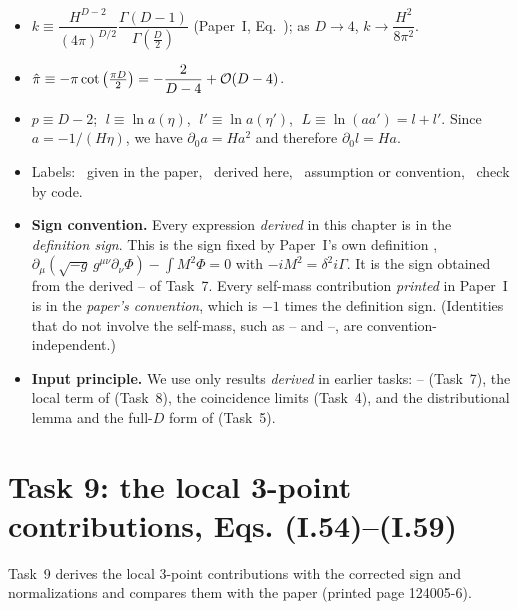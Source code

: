 \begin{notebox}
\begin{itemize}[leftmargin=1.2em,itemsep=1pt]
\item $k\equiv\dfrac{H^{D-2}}{(4\pi)^{D/2}}\dfrac{\Gamma(D-1)}{\Gamma(\frac D2)}$ (Paper~I, Eq.~); as $D\to4$, $k\to\dfrac{H^2}{8\pi^2}$.
\item $\hat\pi\equiv-\pi\cot\big(\tfrac{\pi D}{2}\big)=-\dfrac{2}{D-4}+\mathcal{O}\!\left(D-4\right)$.
\item $p\equiv D-2$; $\;l\equiv\ln a(\eta)$, $\;l'\equiv\ln a(\eta')$, $\;L\equiv\ln(aa')=l+l'$.
Since $a=-1/(H\eta)$, we have $\partial_0a=Ha^2$ and therefore $\partial_0 l=Ha$.
\item Labels: \tP\ given in the paper, \tD\ derived here, \tA\ assumption or convention, \tC\ check by code.
\item \textbf{Sign convention.} Every expression \emph{derived} in this chapter is in the \emph{definition sign}.
This is the sign fixed by Paper~I's own definition , $\partial_\mu(\sqrt{-g}\,g^{\mu\nu}\partial_\nu\Phi)-\int M^2\Phi=0$ with $-iM^2=\delta^2 i\Gamma$.
It is the sign obtained from the derived -- of Task~7.
Every self-mass contribution \emph{printed} in Paper~I is in the \emph{paper's convention}, which is $-1$ times the definition sign.
(Identities that do not involve the self-mass, such as -- and --, are convention-independent.)
\item \textbf{Input principle.} We use only results \emph{derived} in earlier tasks:
-- (Task~7), the local term of  (Task~8), the coincidence limits (Task~4),
and the distributional lemma and the full-$D$ form of  (Task~5).
\end{itemize}
\end{notebox}

\section{Task 9: the local 3-point contributions, Eqs. (I.54)--(I.59)}
\label{sec:ch04:task9}

Task~9 derives the local 3-point contributions with the corrected sign and normalizations and compares them with the paper (printed page 124005-6).

